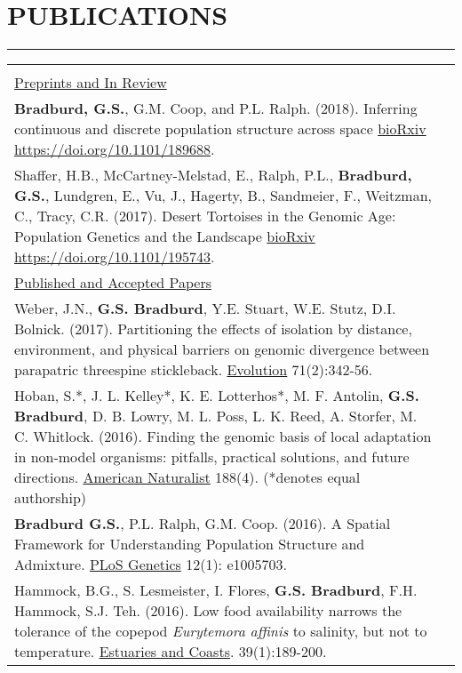 \documentclass{article}
\begin{document}
\section*{PUBLICATIONS}
\vspace{-0.6cm}
\rule{470pt}{0.4pt}
%
\begin{tabular}{>{\everypar{\hangindent1cm}}p{}p{}}
\hfill\\
\underline{Preprints and In Review} \hfill\\
\vspace{-0.1cm}
\textbf{Bradburd, G.S.}, G.M. Coop, and P.L. Ralph. (2018). 
Inferring continuous and discrete population structure across space \underline{bioRxiv} 
\href{https://doi.org/10.1101/189688}{https://doi.org/10.1101/189688}. \\ 
%
\vspace{-0.1cm}
Shaffer, H.B., McCartney-Melstad, E., Ralph, P.L., \textbf{Bradburd, G.S.}, Lundgren, E., Vu, J., Hagerty, B., Sandmeier, F., Weitzman, C., Tracy, C.R.
(2017). Desert Tortoises in the Genomic Age: Population Genetics and the Landscape \underline{bioRxiv}
\href{https://doi.org/10.1101/195743}{https://doi.org/10.1101/195743}.\\
%
\vspace{0.2cm}
%
\underline{Published and Accepted Papers} \hfill\\
\vspace{-0.1cm}
Weber, J.N., \textbf{G.S. Bradburd}, Y.E. Stuart, W.E. Stutz, D.I. Bolnick. (2017).
Partitioning the effects of isolation by distance, environment, and physical barriers 
on genomic divergence between parapatric threespine stickleback.
\underline{Evolution} 71(2):342-56. \\
%
\vspace{-0.1cm}
Hoban, S.*, J. L. Kelley*, K. E. Lotterhos*, M. F. Antolin, \textbf{G.S. Bradburd}, D. B. Lowry, M. L. Poss, L. K. Reed, A. Storfer, M. C. Whitlock. (2016). Finding the genomic basis of local adaptation in non-model organisms: pitfalls, practical solutions, and future directions. \underline{American Naturalist} 188(4). (*denotes equal authorship)\\
%
\vspace{-0.1cm}
\textbf{Bradburd G.S.}, P.L. Ralph, G.M. Coop. (2016). A Spatial Framework for Understanding Population Structure and Admixture. \underline{PLoS Genetics} 12(1): e1005703.\\
%
\vspace{-0.1cm}
Hammock, B.G., S. Lesmeister, I. Flores, \textbf{G.S. Bradburd}, F.H. Hammock, S.J. Teh. (2016). Low food availability narrows the tolerance of the copepod \textit{Eurytemora affinis} to salinity, but not to temperature. \underline{Estuaries and Coasts}.  39(1):189-200.\\

\end{tabular}
\end{document}
